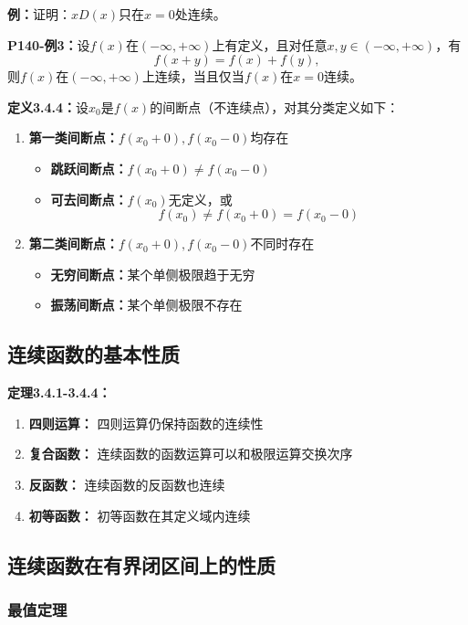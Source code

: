 {\bf 例：}证明：$xD(x)$只在$x=0$处连续。

{\bf P140-例3：}设$f(x)$在$(-\infty,+\infty)$上有定义，且对任意$x,y\in (-\infty,+\infty)$，有
$$f(x+y)=f(x)+f(y),$$
则$f(x)$在$(-\infty,+\infty)$上连续，当且仅当$f(x)$在$x=0$连续。

{\bf 定义3.4.4：}设$x_0$是$f(x)$的间断点（不连续点），对其分类定义如下：
\begin{enumerate}[(1)]
  \setlength{\itemindent}{1cm}
  \item {\bf 第一类间断点：}$f(x_0+0),f(x_0-0)$均存在
  \begin{itemize}
    \item {\bf 跳跃间断点：}$f(x_0+0)\ne f(x_0-0)$
    \item {\bf 可去间断点：}$f(x_0)$无定义，或
    $$f(x_0)\ne f(x_0+0)=f(x_0-0)$$
  \end{itemize}
  \item {\bf 第二类间断点：}$f(x_0+0),f(x_0-0)$不同时存在
  \begin{itemize}
    \item {\bf 无穷间断点：}某个单侧极限趋于无穷
    \item {\bf 振荡间断点：}某个单侧极限不存在
  \end{itemize}
\end{enumerate}

\subsection{连续函数的基本性质}

{\bf 定理3.4.1-3.4.4：}
\begin{enumerate}[(1)]
  \setlength{\itemindent}{1cm}
  \item {\bf 四则运算：} 四则运算仍保持函数的连续性 
  \item {\bf 复合函数：} 连续函数的函数运算可以和极限运算交换次序 
  \item {\bf 反函数：} 连续函数的反函数也连续 
  \item {\bf 初等函数：} 初等函数在其定义域内连续
\end{enumerate}

\subsection{连续函数在有界闭区间上的性质}

\subsubsection{最值定理}

